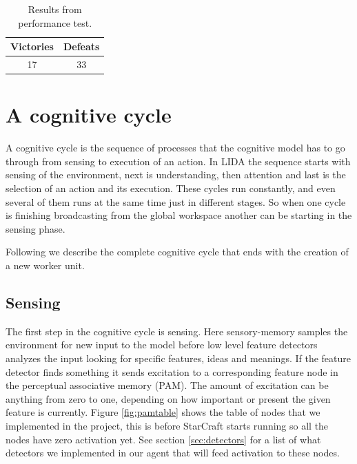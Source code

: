 \begin{table}
\begin{center}
\begin{tabular}{| c | c |}
  \hline
  Victories & Defeats\\
  \hline
  17 & 33 \\
  \hline
\end{tabular}
\caption{Results from performance test.}
\label{tab:test_results}
\end{center}
\end{table}

\section{A cognitive cycle}
\label{sec:cycle}
A cognitive cycle is the sequence of processes that the cognitive model has to go through from sensing to execution of an action. In LIDA the sequence starts with sensing of the environment, next is understanding, then attention and last is the selection of an action and its execution. These cycles run constantly, and even several of them runs at the same time just in different stages. So when one cycle is finishing broadcasting from the global workspace another can be starting in the sensing phase.

Following we describe the complete cognitive cycle that ends with the creation of a new worker unit.

\subsection{Sensing}
The first step in the cognitive cycle is sensing. Here sensory-memory samples the environment for new input to the model before low level feature detectors analyzes the input looking for specific features, ideas and meanings. If the feature detector finds something it sends excitation to a corresponding feature node in the perceptual associative memory (PAM). The amount of excitation can be anything from zero to one, depending on how important or present the given feature is currently. Figure \ref{fig:pamtable} shows the table of nodes that we implemented in the project, this is before StarCraft starts running so all the nodes have zero activation yet. See section \ref{sec:detectors} for a list of what detectors we implemented in our agent that will feed activation to these nodes.


